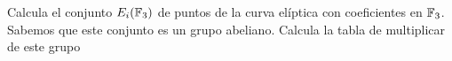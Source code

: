 \documentclass[twoside]{article}
\begin{document}
\newpage

\begin{ejercicio}{8}
 Calcula el conjunto $E_i(\mathbb{F}_3)$ de puntos de la curva elíptica con coeficientes en $\mathbb{F}_3$.
Sabemos que este conjunto es un grupo abeliano. Calcula la tabla de multiplicar de este grupo
\end{ejercicio}
\begin{solucion}

\end{solucion}
\end{document}
